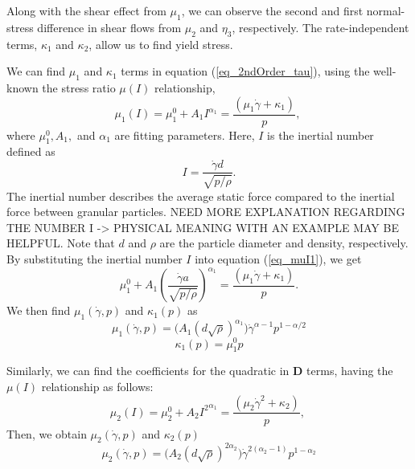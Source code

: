Along with the shear effect from $\mu_1$, we can observe the second and first normal-stress difference in shear flows from $\mu_2$ and $\eta_3$, respectively. The rate-independent terms, $\kappa_1$ and $\kappa_2$, allow us to find yield stress. 
\par
We can find $\mu_1$ and $\kappa_1$ terms in equation (\ref{eq_2ndOrder_tau}), using the well-known the stress ratio $\mu(I)$ relationship,
\begin{equation}
    \mu_1(I) = \mu_1^0 + A_1{ I}^{ \alpha_1} =  \frac{(\mu_1 \dot{\gamma} + \kappa_1)}{p},\
\label{eq_muI1}
\end{equation}
where $\mu_1^0, A_1,$ and $\alpha_1$ are fitting parameters. 
Here, $I$ is the inertial number defined as 
\[
  I =  \frac{\dot{\gamma} d }{\sqrt{p/\rho}}.
\]
The inertial number describes the average static force compared to the inertial force between granular particles. {\color{blue} NEED MORE EXPLANATION REGARDING THE NUMBER I -> PHYSICAL MEANING WITH AN EXAMPLE MAY BE HELPFUL.}
Note that $d$ and $\rho$ are the particle diameter and density, respectively.
By substituting the inertial number $I$ into equation (\ref{eq_muI1}), we get
\begin{equation}
     \mu_1^0 + A_1 {\left(  \frac{\dot{\gamma} a }{\sqrt{p/\rho}}\right) }^{ \alpha_1} =  \frac{(\mu_1 \dot{\gamma} + \kappa_1)}{p}.
\end{equation}
We then find $\mu_1 (\dot{\gamma}, p)$ and $\kappa_1(p)$ as
\begin{equation}
    \mu_1  (\dot{\gamma}, p)= 
    \biggl( A_1 {\left(   d  \sqrt{\rho} \right) }^{ \alpha_1}\biggr) 
     \dot{\gamma}^{\alpha-1} p^{1-\alpha/2}
\label{eq_eta1}
\end{equation}
\begin{equation}
    \kappa_1(p) = \mu_1^0 p
\label{eq_kappa1}
\end{equation}
\par
Similarly, we can find the coefficients for the quadratic in ${\bm D}$ terms, having the $\mu(I)$ relationship as follows:
\begin{equation}
    \mu_2(I) = \mu_2^0 + A_2{ I^2}^{ \alpha_1} =  \frac{(\mu_2 \dot{\gamma}^2 + \kappa_2)}{p},\
\label{eq_muI2}
\end{equation}
Then, we obtain $\mu_2 (\dot{\gamma}, p)$ and $\kappa_2(p)$
\begin{equation}
    \mu_2  (\dot{\gamma}, p)= 
    \biggl( A_2 {\left(   d  \sqrt{\rho} \right) }^{ 2\alpha_2}\biggr) 
     {\dot{\gamma}}^{2(\alpha_2-1)} p^{1-\alpha_2}
\label{eq_eta2}
\end{equation}
